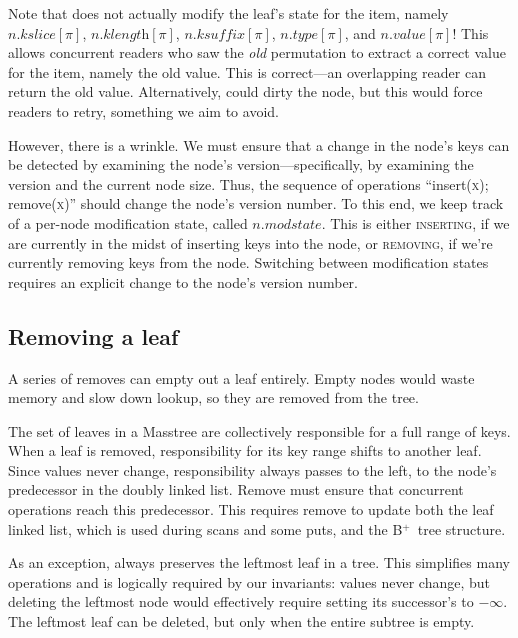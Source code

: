 \documentclass[11pt]{article}
\newcommand{\V}[1]{\textit{#1}}
\newcommand{\N}[1]{\text{\upshape{#1}}}
\newcommand{\INSERTING}{\textsc{inserting}}
\newcommand{\REMOVING}{\textsc{removing}}
\newcommand{\Bplus}{B\(^+\)}
\begin{document}
Note that \N{remove} does not actually modify the leaf's state for the
item, namely \(n.\V{kslice}[\pi]\), \(n.\V{klength}[\pi]\),
\(n.\V{ksuffix}[\pi]\), \(n.\V{type}[\pi]\), and \(n.\V{value}[\pi]\)!
This allows concurrent readers who saw the \emph{old} permutation to
extract a correct value for the item, namely the old value. This is
correct---an overlapping reader can return the old value. Alternatively,
\N{remove} could dirty the node, but this would force readers to retry,
something we aim to avoid.

However, there is a wrinkle. We must ensure that a change in the node's keys
can be detected by examining the node's version---specifically, by examining
the version and the current node size. Thus, the sequence of operations
``insert(\textsc{x}); remove(\textsc{x})'' should change the node's version
number. To this end, we keep track of a per-node modification state, called
\(n.\V{modstate}\). This is either \INSERTING, if we are currently in the
midst of inserting keys into the node, or \REMOVING, if we're currently
removing keys from the node. Switching between modification states requires an
explicit change to the node's version number.

\subsection{Removing a leaf}

A series of removes can empty out a leaf entirely. Empty nodes would
waste memory and slow down lookup, so they are removed from the tree.

The set of leaves in a Masstree are collectively responsible for a full
range of keys. When a leaf is removed, responsibility for its key range
shifts to another leaf. Since \N{lowkey} values never change,
responsibility always passes to the left, to the node's predecessor in
the doubly linked list. Remove must ensure that concurrent operations
reach this predecessor. This requires remove to update both the leaf
linked list, which is used during scans and some puts, and the
\Bplus\ tree structure.

As an exception, \N{remove} always preserves the leftmost leaf in a
tree. This simplifies many operations and is logically required by our
invariants: \N{lowkey} values never change, but deleting the leftmost
node would effectively require setting its successor's \N{lowkey} to
$-\infty$. The leftmost leaf can be deleted, but only when the entire
subtree is empty.
\end{document}
